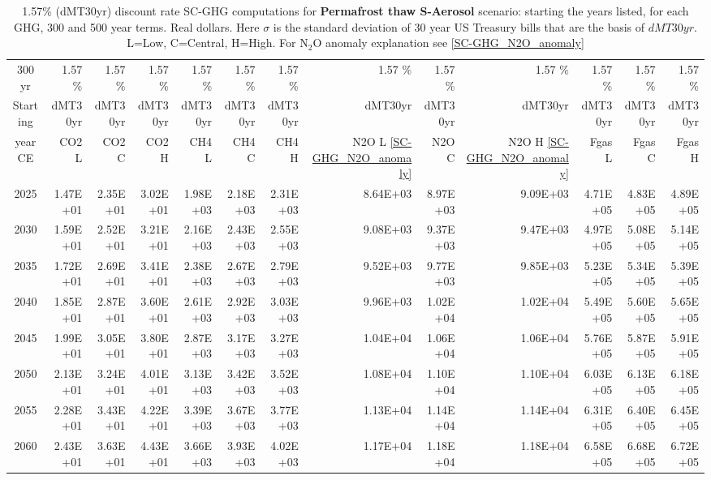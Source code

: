 \documentclass{article}
\begin{document}
\begin{table}
   \caption{1.57\% (dMT30yr) discount rate  SC-GHG computations for \textbf{Permafrost thaw S-Aerosol} scenario: starting the years listed, for each GHG, 300 and 500 year terms. Real dollars. Here $\sigma$ is the standard deviation of 30 year US Treasury bills that are the basis of $dMT30yr$. L=Low, C=Central, H=High. For N$_2$O anomaly explanation see \ref{SC-GHG_N2O_anomaly}} 
\label{PVs_300_yearSCC_SH1.57}
\small
\begin{tabular}{crrr|rrr|rrr|rrr}
300 yr   & 1.57 \%  & 1.57 \%  & 1.57 \%  & 1.57 \%  & 1.57 \%  & 1.57 \%  & 1.57 \%  & 1.57 \%  & 1.57 \%  & 1.57 \%  & 1.57 \%  & 1.57 \%  \\
Starting & dMT30yr  & dMT30yr  & dMT30yr  & dMT30yr  & dMT30yr  & dMT30yr  & dMT30yr  & dMT30yr  & dMT30yr  & dMT30yr  & dMT30yr  & dMT30yr  \\
year CE  & CO2 L    & CO2 C    & CO2 H    & CH4 L    & CH4 C    & CH4 H    & N2O L \ref{SC-GHG_N2O_anomaly}     & N2O C      & N2O H \ref{SC-GHG_N2O_anomaly}    & Fgas L   & Fgas C   & Fgas H   \\
2025     & 1.47E+01 & 2.35E+01 & 3.02E+01 & 1.98E+03 & 2.18E+03 & 2.31E+03 & 8.64E+03 & 8.97E+03 & 9.09E+03 & 4.71E+05 & 4.83E+05 & 4.89E+05 \\
2030     & 1.59E+01 & 2.52E+01 & 3.21E+01 & 2.16E+03 & 2.43E+03 & 2.55E+03 & 9.08E+03 & 9.37E+03 & 9.47E+03 & 4.97E+05 & 5.08E+05 & 5.14E+05 \\
2035     & 1.72E+01 & 2.69E+01 & 3.41E+01 & 2.38E+03 & 2.67E+03 & 2.79E+03 & 9.52E+03 & 9.77E+03 & 9.85E+03 & 5.23E+05 & 5.34E+05 & 5.39E+05 \\
2040     & 1.85E+01 & 2.87E+01 & 3.60E+01 & 2.61E+03 & 2.92E+03 & 3.03E+03 & 9.96E+03 & 1.02E+04 & 1.02E+04 & 5.49E+05 & 5.60E+05 & 5.65E+05 \\
2045     & 1.99E+01 & 3.05E+01 & 3.80E+01 & 2.87E+03 & 3.17E+03 & 3.27E+03 & 1.04E+04 & 1.06E+04 & 1.06E+04 & 5.76E+05 & 5.87E+05 & 5.91E+05 \\
2050     & 2.13E+01 & 3.24E+01 & 4.01E+01 & 3.13E+03 & 3.42E+03 & 3.52E+03 & 1.08E+04 & 1.10E+04 & 1.10E+04 & 6.03E+05 & 6.13E+05 & 6.18E+05 \\
2055     & 2.28E+01 & 3.43E+01 & 4.22E+01 & 3.39E+03 & 3.67E+03 & 3.77E+03 & 1.13E+04 & 1.14E+04 & 1.14E+04 & 6.31E+05 & 6.40E+05 & 6.45E+05 \\
2060     & 2.43E+01 & 3.63E+01 & 4.43E+01 & 3.66E+03 & 3.93E+03 & 4.02E+03 & 1.17E+04 & 1.18E+04 & 1.18E+04 & 6.58E+05 & 6.68E+05 & 6.72E+05 \\

\end{tabular}
\end{table}
\end{document}

